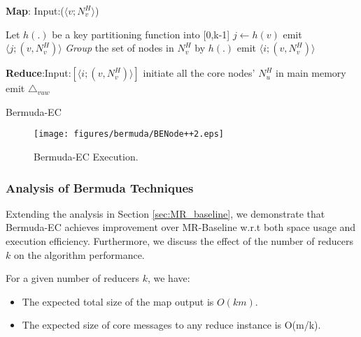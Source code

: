 \begin{algorithm}[tb]
	\begin{algorithmic}[1]
			\item[] \textbf{Map}: Input:($ \langle v; N_v^H \rangle$) 
            \item[] {Let $h(.)$ be a key partitioning function into [0,k-1] }
			\STATE $j \leftarrow h(v)$
			\STATE emit $\langle j;(v,N_v^H) \rangle$
			\STATE \emph{Group} the set of nodes in $N_v^H$ by $h(.)$
					\STATE emit $\langle i;(v,N_v^H) \rangle$
				\ENDIF
			\ENDFOR
            \item[]
			\item[] \textbf{Reduce}:Input:$[\langle i;(v,N_v^H) \rangle]$ 
			\STATE initiate all the core nodes' $N_u^H$ in main memory
                        \STATE emit $\triangle_{vuw}$
                    \ENDFOR
            \ENDFOR
			\ENDFOR
			\end{algorithmic}
		\caption{Bermuda-EC}
		\label{alg:Bermuda-EC}
\end{algorithm}
\begin{figure}[t]
		\centering	
        \texttt{[image: figures/bermuda/BENode++2.eps]}
		\caption {\small{Bermuda-EC Execution.}}
		\label{fig:Bermuda-EC}
\end{figure}



\subsubsection{Analysis of Bermuda Techniques}
\label{sec:ECAnalysis}
Extending  the analysis in Section \ref{sec:MR_baseline}, we demonstrate that Bermuda-EC achieves improvement over MR-Baseline w.r.t both space usage and execution efficiency. 
Furthermore, we discuss the effect of the number of reducers  $k$ on the algorithm performance.

\begin{theorem}
\label{th:ECsize}
	For a given number of reducers $k$, we have:
    \begin{itemize}
    	\item {The expected total size of the map output is $O(km)$}.
        \item {The expected size of core messages to any reduce instance is O(m/k)}. 
    \end{itemize}
\end{theorem}

